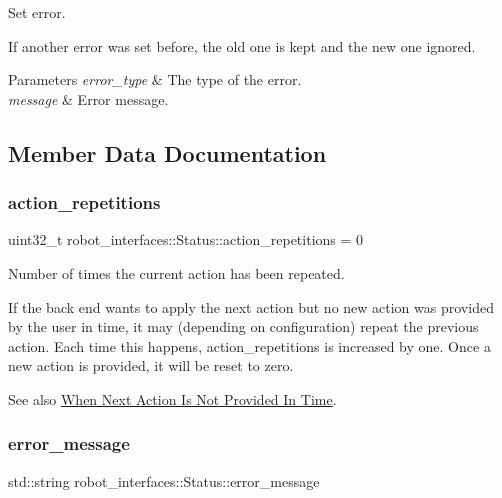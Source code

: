 Set error. 

If another error was set before, the old one is kept and the new one ignored.


\begin{DoxyParams}{Parameters}
{\em error\+\_\+type} & The type of the error. \\
\hline
{\em message} & Error message. \\
\hline
\end{DoxyParams}


\subsection{Member Data Documentation}
\mbox{\label{structrobot__interfaces_1_1Status_a8ccb682cd2ba81059991f3b0b9ff0c00}} 
\subsubsection{\texorpdfstring{action\+\_\+repetitions}{action\_repetitions}}
{\footnotesize\ttfamily uint32\+\_\+t robot\+\_\+interfaces\+::\+Status\+::action\+\_\+repetitions = 0}



Number of times the current action has been repeated. 

If the back end wants to apply the next action but no new action was provided by the user in time, it may (depending on configuration) repeat the previous action. Each time this happens, {\ttfamily action\+\_\+repetitions} is increased by one. Once a new action is provided, it will be reset to zero.

See also \hyperlink{md_docs_timeseries_next-action-not-in-time}{When Next Action Is Not Provided In Time}. \mbox{\label{structrobot__interfaces_1_1Status_a7da10fb73cd19f2840c438d321eac744}} 
\subsubsection{\texorpdfstring{error\+\_\+message}{error\_message}}
{\footnotesize\ttfamily std\+::string robot\+\_\+interfaces\+::\+Status\+::error\+\_\+message}



